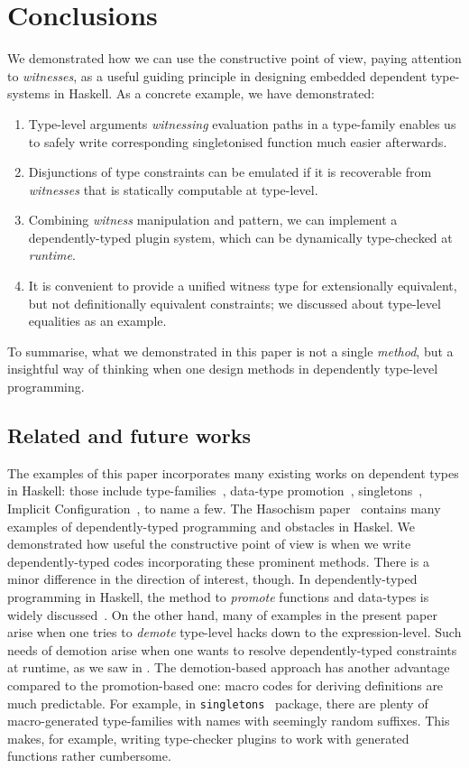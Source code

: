 \documentclass[demotion-paper.tex]{subfiles}
\begin{document}
\section{Conclusions}
\label{sec:concl}
We demonstrated how we can use the constructive point of view, paying attention to \emph{witnesses}, as a useful guiding principle in designing embedded dependent type-systems in Haskell.
As a concrete example, we have demonstrated:
\begin{enumerate}
  \item Type-level arguments \emph{witnessing} evaluation paths in a type-family enables us to safely write corresponding singletonised function much easier afterwards.
  \item Disjunctions of type constraints can be emulated if it is recoverable from \emph{witnesses} that is statically computable at type-level.
  \item Combining \emph{witness} manipulation and  pattern, we can implement a dependently-typed plugin system, which can be dynamically type-checked at \emph{runtime}.
  \item It is convenient to provide a unified witness type for extensionally equivalent, but not definitionally equivalent constraints; we discussed about type-level equalities as an example.
\end{enumerate}
To summarise, what we demonstrated in this paper is not a single \emph{method}, but a insightful way of thinking when one design methods in dependently type-level programming.

\subsection{Related and future works}
The examples of this paper incorporates many existing works on dependent types in Haskell: those include type-families~\cite{Kiselyov:2010aa}, data-type promotion~\cite{Yorgey:2012}, singletons~\cite{Eisenberg:2012}, Implicit Configuration~\cite{Kiselyov:2004aa}, to name a few.
The Hasochism paper~\cite{10.1145/2503778.2503786} contains many examples of dependently-typed programming and obstacles in Haskel.
We demonstrated how useful the constructive point of view is when we write dependently-typed codes incorporating these prominent methods.
There is a minor difference in the direction of interest, though.
In dependently-typed programming in Haskell, the method to \emph{promote} functions and data-types is widely discussed~\cite{Yorgey:2012,Eisenberg:2012,10.1145/2503778.2503786}.
On the other hand, many of examples in the present paper arise when one tries to \emph{demote} type-level hacks down to the expression-level.
Such needs of demotion arise when one wants to resolve dependently-typed constraints at runtime, as we saw in .
The demotion-based approach has another advantage compared to the promotion-based one: macro codes for deriving definitions are much predictable.
For example, in \texttt{singletons}~\cite{singletons} package, there are plenty of macro-generated type-families with names with seemingly random suffixes.
This makes, for example, writing type-checker plugins to work with generated functions rather cumbersome.
\end{document}

